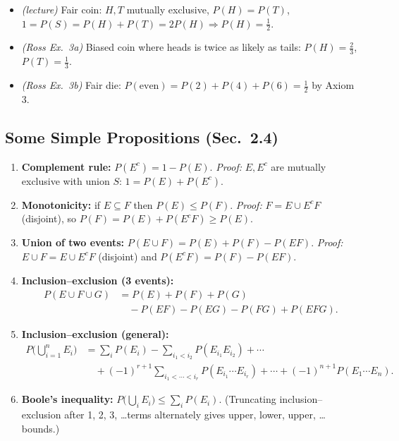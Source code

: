 \documentclass[11pt]{article}
\let\oldsubsection\subsection
\renewcommand{\subsection}{\Needspace{14\baselineskip}\oldsubsection}
\begin{document}
\begin{exbox}[Examples]
\begin{itemize}
\item \emph{(lecture)} Fair coin: $H,T$ mutually exclusive, $P(H)=P(T)$, $1=P(S)=P(H)+P(T)=2P(H)\Rightarrow P(H)=\frac12$.
\item \emph{(Ross Ex.\ 3a)} Biased coin where heads is twice as likely as tails: $P(H)=\frac23$, $P(T)=\frac13$.
\item \emph{(Ross Ex.\ 3b)} Fair die: $P(\text{even})=P(2)+P(4)+P(6)=\frac12$ by Axiom 3.
\end{itemize}
\end{exbox}

\subsection{Some Simple Propositions (Sec.\ 2.4)}

\begin{thmbox}[Propositions 4.1--4.4]
\begin{enumerate}
\item \textbf{Complement rule:} $P(E^c)=1-P(E)$. \emph{Proof:} $E,E^c$ are mutually exclusive with union $S$: $1=P(E)+P(E^c)$.
\item \textbf{Monotonicity:} if $E\subseteq F$ then $P(E)\le P(F)$. \emph{Proof:} $F=E\cup E^cF$ (disjoint), so $P(F)=P(E)+P(E^cF)\ge P(E)$.
\item \textbf{Union of two events:} $P(E\cup F)=P(E)+P(F)-P(EF)$. \emph{Proof:} $E\cup F=E\cup E^cF$ (disjoint) and $P(E^cF)=P(F)-P(EF)$.
\item \textbf{Inclusion--exclusion (3 events):}
\begin{align*}
P(E\cup F\cup G)&=P(E)+P(F)+P(G)\\
&\quad-P(EF)-P(EG)-P(FG)+P(EFG).
\end{align*}
\item \textbf{Inclusion--exclusion (general):}
\begin{align*} P\Big(\bigcup_{i=1}^nE_i\Big)&=\sum_iP(E_i)-\sum_{i_1<i_2}P(E_{i_1}E_{i_2})+\cdots\\ &\quad+(-1)^{r+1}\!\!\sum_{i_1<\cdots<i_r}\!\!P(E_{i_1}\cdots E_{i_r})+\cdots+(-1)^{n+1}P(E_1\cdots E_n). \end{align*}
\item \textbf{Boole's inequality:} $P\big(\bigcup_iE_i\big)\le\sum_iP(E_i)$. (Truncating inclusion--exclusion after 1, 2, 3, \dots terms alternately gives upper, lower, upper, \dots bounds.)
\end{enumerate}
\end{thmbox}
\end{document}
